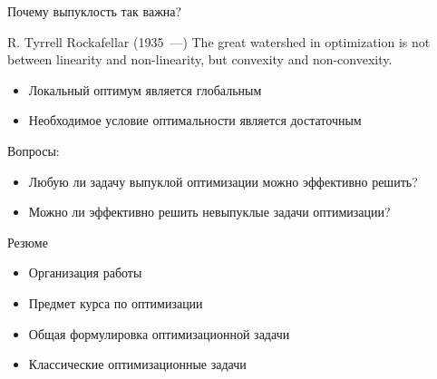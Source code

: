\documentclass[12pt]{beamer}
\begin{document}
\begin{frame}{Почему выпуклость так важна?}
\begin{block}{R. Tyrrell Rockafellar (1935~---)}
The great watershed in optimization is not between linearity and
non-linearity, but convexity and non-convexity.
\end{block}
\begin{itemize}
\item Локальный оптимум является глобальным
\item Необходимое условие оптимальности является достаточным
\end{itemize}
Вопросы:
\begin{itemize}
\item Любую ли задачу выпуклой оптимизации можно эффективно решить?
\item Можно ли эффективно решить невыпуклые задачи оптимизации?
\end{itemize}
\end{frame}

\begin{frame}{Резюме}
\begin{itemize}
\item Организация работы
\item Предмет курса по оптимизации
\item Общая формулировка оптимизационной задачи
\item Классические оптимизационные задачи
\end{itemize}
\end{frame}
\end{document}
